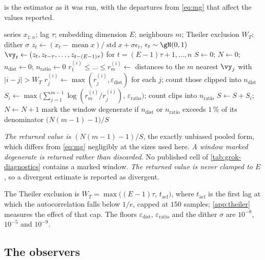 \documentclass{article}
\begin{document}
 is the estimator as it was run, with the departures from \cref{eq:mg} that affect
the values reported.

\begin{algorithm}[H]
\caption{Pooled Levina--Bickel intrinsic dimension of a delay reconstruction}
\label{alg:mg}
\begin{algorithmic}[1]
\Require series $x_{1:n}$; lag $\tau$; embedding dimension $E$; neighbours $m$; Theiler
exclusion $W_T$; dither $\sigma$
\State $z_t \gets (x_t - \operatorname{mean} x) / \operatorname{std} x + \sigma \epsilon_t$,\quad
       $\epsilon_t \sim \gN(0,1)$ 
\State $\vy_t \gets (z_t, z_{t-\tau}, \dots, z_{t-(E-1)\tau})$ for $t = (E-1)\tau+1, \dots, n$
\State $S \gets 0$; $N \gets 0$; $n_{\mathrm{dist}} \gets 0$; $n_{\mathrm{ratio}} \gets 0$
  \State $r^{(i)}_1 \le \dots \le r^{(i)}_m \gets$ distances to the $m$ nearest $\vy_j$
         with $|i-j| > W_T$
  \State $r^{(i)}_j \gets \max(r^{(i)}_j, \varepsilon_{\mathrm{dist}})$ for each $j$; count those
         clipped into $n_{\mathrm{dist}}$
  \State $S_i \gets \max\bigl(\sum_{j=1}^{m-1} \log(r^{(i)}_m / r^{(i)}_j),\,
         \varepsilon_{\mathrm{ratio}}\bigr)$; count clips into $n_{\mathrm{ratio}}$
  \State $S \gets S + S_i$; \quad $N \gets N + 1$
\EndFor
\State mark the window degenerate if $n_{\mathrm{dist}}$ or $n_{\mathrm{ratio}}$ exceeds
       $1\,\%$ of its denominator
\State \Return $\bigl(N(m-1) - 1\bigr) / S$
\end{algorithmic}
\end{algorithm}

\emph{The returned value is $(N(m-1)-1)/S$}, the exactly unbiased pooled form, which differs from
\cref{eq:mg} negligibly at the sizes used here. \emph{A window marked degenerate is
returned rather than discarded.} No published cell of \cref{tab:grok-diagnostics} contains a marked
window. \emph{The returned value is never clamped to $E$}, so a divergent estimate is reported as
divergent.

The Theiler exclusion is $W_T = \max\bigl((E-1)\tau,\, t_{\mathrm{acf}}\bigr)$, where
$t_{\mathrm{acf}}$ is the first lag at which the autocorrelation falls below $1/e$, capped at $150$
samples; \cref{app:theiler} measures the effect of that cap. The floors $\varepsilon_{\mathrm{dist}}$, $\varepsilon_{\mathrm{ratio}}$ and
the dither $\sigma$ are $10^{-8}$, $10^{-5}$ and $10^{-9}$.

\subsection{The observers}\label{app:obs}
\end{document}

